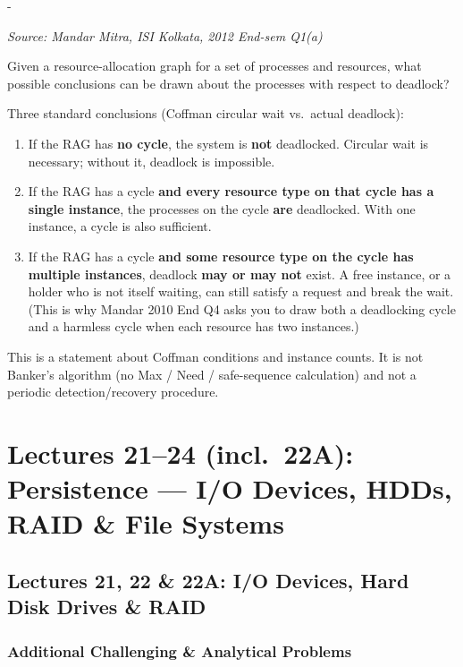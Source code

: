 \documentclass[11pt,a4paper]{article}
\makeatletter
\newcommand{\keepspace}[1]{\par\penalty-100\begingroup
  \setlength{\dimen@}{#1}\dimen@ii\pagegoal\advance\dimen@ii-\pagetotal
  \ifdim\dimen@>\dimen@ii\ifdim\dimen@ii>\z@\vfil\fi\break\fi\endgroup}
\newcounter{qn}[section]
\newenvironment{Qn}[4]{%
  \refstepcounter{qn}\keepspace{7\baselineskip}%
  \begin{tcolorbox}[qboxstyle, title={Q\thesection.\theqn\ \ [#1 \textbar\ #2]\ \ #4}]%
  {\footnotesize\color{g3}\textit{Source: #3}}\par\smallskip%
}{%
  \end{tcolorbox}%
}
\newenvironment{Sol}{%
  \begin{tcolorbox}[sboxstyle, title={Solution}]%
}{%
  \end{tcolorbox}\vspace{0.35em}%
}
\makeatother
\begin{document}
\begin{Qn}{Easy-Medium}{Lect 20}{Mandar Mitra, ISI Kolkata, 2012 End-sem Q1(a)}{What a RAG can tell you about deadlock}
Given a resource-allocation graph for a set of processes and resources,
what possible conclusions can be drawn about the processes with respect
to deadlock?
\end{Qn}
\begin{Sol}
Three standard conclusions (Coffman circular wait vs.\ actual deadlock):
\begin{enumerate}
  \item If the RAG has \textbf{no cycle}, the system is \textbf{not}
        deadlocked. Circular wait is necessary; without it, deadlock is
        impossible.
  \item If the RAG has a cycle \textbf{and every resource type on that
        cycle has a single instance}, the processes on the cycle
        \textbf{are} deadlocked. With one instance, a cycle is also
        sufficient.
  \item If the RAG has a cycle \textbf{and some resource type on the
        cycle has multiple instances}, deadlock \textbf{may or may not}
        exist. A free instance, or a holder who is not itself waiting,
        can still satisfy a request and break the wait. (This is why
        Mandar 2010 End Q4 asks you to draw both a deadlocking cycle and
        a harmless cycle when each resource has two instances.)
\end{enumerate}
This is a statement about Coffman conditions and instance counts. It is
not Banker's algorithm (no Max / Need / safe-sequence calculation) and
not a periodic detection/recovery procedure.
\end{Sol}

\clearpage

\section{Lectures 21--24 (incl.\ 22A): Persistence --- I/O Devices, HDDs, RAID \& File Systems}

\subsection{Lectures 21, 22 \& 22A: I/O Devices, Hard Disk Drives \& RAID}

\subsubsection*{Additional Challenging \& Analytical Problems}
\end{document}

